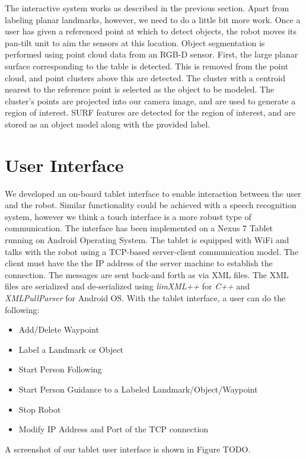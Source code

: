 \documentclass[12pt]{gatech-thesis}
\begin{document}
The interactive system works as described in the previous section. Apart from labeling planar landmarks, however, we need to do a little bit more work. Once a user has given a referenced point at which to detect
objects, the robot moves its pan-tilt unit to aim the sensors
at this location. Object segmentation is performed using
point cloud data from an RGB-D sensor. First, the large
planar surface corresponding to the table is detected. This
is removed from the point cloud, and point clusters above
this are detected. The cluster with a centroid nearest to the
reference point is selected as the object to be modeled. The
cluster’s points are projected into our camera image, and
are used to generate a region of interest. SURF features are
detected for the region of interest, and are stored as an object
model along with the provided label.

\section{User Interface}
\label{sec:map_ui}

We developed an on-board tablet interface to enable interaction between the user and the robot. Similar functionality could be achieved with a speech recognition system, however we think a touch interface is a more robust type of communication. The interface has been implemented on a Nexus 7 Tablet running on Android Operating System. The tablet is equipped with WiFi and talks with the robot using a TCP-based server-client communication model. The client must have the the IP address of the server machine to establish the connection. The messages are sent back-and forth as via XML files. The XML files are serialized and de-serialized using \textit{limXML++} for \textit{C++} and \textit{XMLPullParser} for Android OS. With the tablet interface, a user can do the following:

\begin{itemize}
\item Add/Delete Waypoint
\item Label a Landmark or Object
\item Start Person Following
\item Start Person Guidance to a Labeled Landmark/Object/Waypoint
\item Stop Robot
\item Modify IP Address and Port of the TCP connection
\end{itemize}

A screenshot of our tablet user interface is shown in Figure TODO.
\end{document}
